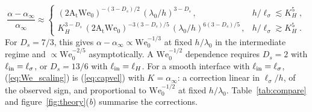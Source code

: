 \documentclass[lineno]{jfm}
\newcommand{\At}{\mathrm{A_t}}
\newcommand{\We}{\mathrm{We}_0}
\newcommand{\lls}{\ell_\sigma}
\begin{document}
\begin{equation}
  \frac{\alpha - \alpha_\infty}{\alpha_\infty} \approx
  \begin{cases}
  (2 \At \We)^{-(3 - D_s)/2} \, (\lambda_0/h)^{3 - D_s} \, , & h/\lls \lesssim K_H^5 \;, \\
  K_H^{3 - D_s} \,(2 \At \We)^{-3(3 - D_s)/5} \, (\lambda_0/h)^{6(3 - D_s)/5} \, , & h/\lls \gtrsim K_H^5 \;.
  \end{cases}
  \label{eq:We_scaling}
\end{equation}
For $D_s = 7/3$, this gives $\alpha - \alpha_\infty \propto \We^{-1/3}$ at fixed $h/\lambda_0$ in the intermediate regime and $\propto \We^{-2/5}$ asymptotically. A $\We^{-1/2}$ dependence requires $D_s = 2$ with $\ell_{\rm in} = \lls$, or $D_s = 13/6$ with $\ell_{\rm in} = \ell_H$. For a smooth interface with $\ell_{\rm in} = \lls$, (\ref{eq:We_scaling}) is (\ref{eq:capvel}) with $K = \alpha_\infty$: a correction linear in $\lls/h$, of the observed sign, and proportional to $\We^{-1/2}$ at fixed $h/\lambda_0$. Table~\ref{tab:compare} and figure~\ref{fig:theory}(\textit{b}) summarise the corrections.
\end{document}
